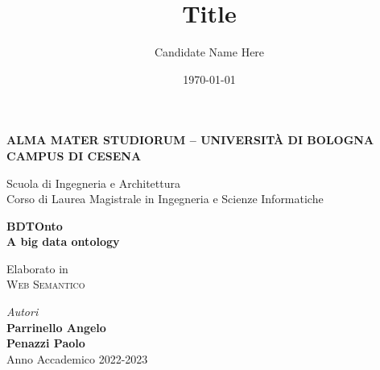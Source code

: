 \title{Title}
\author{Candidate Name Here}
\date{\today}

\begin{titlepage}
	\begin{center}
		
		\large
		\textbf{ALMA MATER STUDIORUM -- UNIVERSITÀ DI BOLOGNA \\ CAMPUS DI CESENA}
		\\
		\noindent\hrulefill
		\vspace{0.4cm}
		
		\Large
		Scuola di Ingegneria e Architettura \\
		Corso di Laurea Magistrale in Ingegneria e Scienze Informatiche
		
		\Huge
		\vspace{4cm}
		\textbf{
			BDTOnto
			\\
			A big data ontology
			\\
		}
		
		\large
		\vspace{1cm}
		Elaborato in 
		\\
		\textsc{Web Semantico}
		
		\vspace{5.5cm}
		\textit{Autori} 
				\\ 
				\textbf{Parrinello Angelo}
				\\
				\textbf{Penazzi Paolo}
		\vfill
		\noindent\hrulefill
		\vspace{0.3cm}
		\Large
		\\
		Anno Accademico 2022-2023
	\end{center}
\end{titlepage}
\restoregeometry
